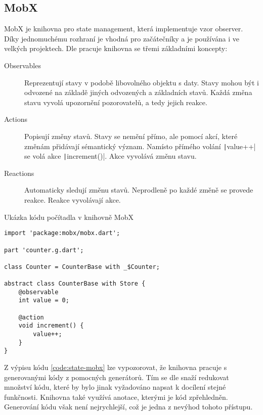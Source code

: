 \subsection{MobX}

MobX je knihovna pro state management,
která implementuje vzor observer.
Díky jednomuchému rozhraní je vhodná pro začátečníky
a je používána i ve velkých projektech.
Dle \cite{mobx_core_concepts} pracuje knihovna se třemi základními koncepty:

\begin{description}
    \item[Observables] Reprezentují stavy v podobě libovolného objektu s daty.
    Stavy mohou být i odvozené na základě jiných odvozených a základních stavů.
    Každá změna stavu vyvolá upozornění pozorovatelů, a tedy jejich reakce.
    \item[Actions] Popisují změny stavů.
    Stavy se nemění přímo,
    ale pomocí akcí,
    které změnám přidávají sémantický význam.
    Namísto přímého volání \texttt|value++| se volá akce
    \texttt|increment()|.
    Akce vyvolává změnu stavu.
    \item[Reactions] Automaticky sledují změnu stavů.
    Neprodleně po každé změně se provede reakce.
    Reakce vyvolávají akce.
\end{description}

\begin{listing}
    \caption{Ukázka kódu počítadla v knihovně MobX \cite{mobx_core_concepts}}
    \label{code:state-mobx}
    \begin{verbatim}
import 'package:mobx/mobx.dart';

part 'counter.g.dart';

class Counter = CounterBase with _$Counter;

abstract class CounterBase with Store {
    @observable
    int value = 0;

    @action
    void increment() {
        value++;
    }
}
    \end{verbatim}
\end{listing}

Z výpisu kódu \ref{code:state-mobx} lze vypozorovat,
že knihovna pracuje s generovanými kódy z pomocných generátorů.
Tím se dle \cite{mobx_core_concepts} snaží redukovat množství kódu,
které by bylo jinak vyžadováno napsat k docílení stejné funkčnosti.
Knihovna také využívá anotace,
kterými je kód zpřehledněn.
Generování kódu však není nejrychlejší,
což je jedna z nevýhod tohoto přístupu.

